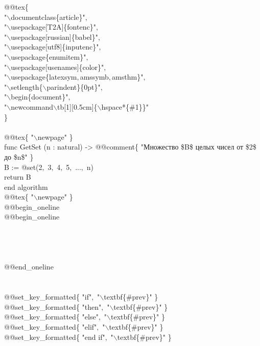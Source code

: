 \tb @@tex\{ \\
\tb "$\backslash$documentclass\{article\}"$,$ \\
\tb "$\backslash$usepackage[T2A]\{fontenc\}"$,$ \\
\tb "$\backslash$usepackage[russian]\{babel\}"$,$ \\
\tb "$\backslash$usepackage[utf8]\{inputenc\}"$,$ \\
\tb "$\backslash$usepackage\{enumitem\}"$,$ \\
\tb "$\backslash$usepackage[usenames]\{color\}"$,$ \\
\tb "$\backslash$usepackage\{latexsym$,$amssymb$,$amsthm\}"$,$ \\
\tb "$\backslash$setlength\{$\backslash$parindent\}\{0pt\}"$,$ \\
\tb "$\backslash$begin\{document\}"$,$ \\
\tb "$\backslash$newcommand$\backslash$tb[1][0.5cm]\{$\backslash$hspace*\{\#1\}\}" \\
\tb \} \\
\\
\tb @@tex\{ "$\backslash$newpage" \} \\
func GetSet (n : natural) -> @@comment\{ "Множество \$B\$ целых чисел от \$2\$ до \$n\$" \} \\
\tb B := @set(2$,$ 3$,$ 4$,$ 5$,$ ...$,$ n) \\
\tb return B \\
end algorithm \\
\tb @@tex\{ "$\backslash$newpage" \} \\
\tb @@begin\_oneline \\
\tb @@begin\_oneline \\
\\
\\
\\
\\
\tb @@end\_oneline \\
\\
\\
\tb @@set\_key\_formatted\{ "if"$,$ "$\backslash$textbf\{\#prev\}" \} \\
\tb @@set\_key\_formatted\{ "then"$,$ "$\backslash$textbf\{\#prev\}" \} \\
\tb @@set\_key\_formatted\{ "else"$,$ "$\backslash$textbf\{\#prev\}" \} \\
\tb @@set\_key\_formatted\{ "elif"$,$ "$\backslash$textbf\{\#prev\}" \} \\
\tb @@set\_key\_formatted\{ "end if"$,$ "$\backslash$textbf\{\#prev\}" \} \\

